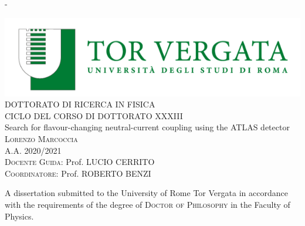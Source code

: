 
\begin{adjustwidth*}{\unitlength}{-\unitlength}
	\begin{center}
		\includegraphics[scale=1]{frontmatter/figures/uniroma2}\\
		\vspace{1cm}
		{\large\textsc{DOTTORATO DI RICERCA IN FISICA}}\\
		\vspace{0.8cm}
		{\large\textsc{CICLO DEL CORSO DI DOTTORATO XXXIII}}\\
		\vspace{1cm}
		{\LARGE{Search for flavour-changing neutral-current \tZc
				coupling using the ATLAS detector}}\\
		\vspace{6.5mm}
		{\large\textsc{Lorenzo Marcoccia}}\\
		\vspace{1cm}
		{\large\textsc{A.A. 2020/2021}}\\
		\vspace{10mm}
		{\large{\textsc{Docente Guida:}  Prof. LUCIO CERRITO}}\\ 
		\vspace{5mm}
		{\large{\textsc{Coordinatore:   }  Prof. ROBERTO BENZI}}\\ 
		\vspace{3mm}
		\begin{minipage}{10cm}
			\vspace{1cm}
			A dissertation submitted to the University of Rome Tor Vergata  in accordance with the requirements of the degree of \textsc{Doctor of Philosophy} in the Faculty of Physics.
		\end{minipage}\\
		\vspace{9mm}
		{\large\textsc{}}
		\vspace{12mm}
	\end{center}
\end{adjustwidth*}
\newpage